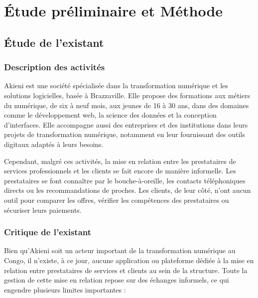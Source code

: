 \chapter{Étude préliminaire et Méthode}
\pagestyle{styleGlobal}
\label{chap:etude_preliminaire}

\section{Étude de l'existant}

\subsection{Description des activités}

Akieni est une société spécialisée dans la transformation numérique et les solutions logicielles, basée à Brazzaville. Elle propose des formations aux métiers du numérique, de six à neuf mois, aux jeunes de 16 à 30 ans, dans des domaines comme le développement web, la science des données et la conception d'interfaces. Elle accompagne aussi des entreprises et des institutions dans leurs projets de transformation numérique, notamment en leur fournissant des outils digitaux adaptés à leurs besoins.

Cependant, malgré ces activités, la mise en relation entre les prestataires de services professionnels et les clients se fait encore de manière informelle. Les prestataires se font connaître par le bouche-à-oreille, les contacts téléphoniques directs ou les recommandations de proches. Les clients, de leur côté, n'ont aucun outil pour comparer les offres, vérifier les compétences des prestataires ou sécuriser leurs paiements.

\subsection{Critique de l'existant}

Bien qu'Akieni soit un acteur important de la transformation numérique au Congo, il n'existe, à ce jour, aucune application ou plateforme dédiée à la mise en relation entre prestataires de services et clients au sein de la structure. Toute la gestion de cette mise en relation repose sur des échanges informels, ce qui engendre plusieurs limites importantes :

